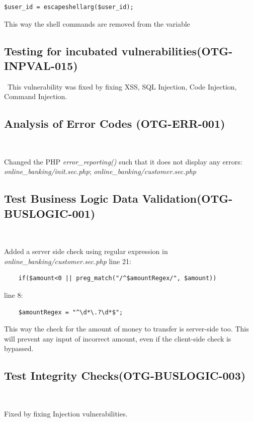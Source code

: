 \documentclass[headsepline,footsepline,footinclude=false,oneside,fontsize=11pt,paper=a4,listof=totoc,bibliography=totoc]{scrbook} %
\begin{document}
\begin{lstlisting} 
$user_id = escapeshellarg($user_id);
\end{lstlisting}

 This way the shell commands are removed from the variable\\
 

\subsection{Testing for incubated vulnerabilities(OTG-INPVAL-015)}\
This vulnerability was fixed by fixing XSS, SQL Injection, Code Injection, Command Injection.
 
 
\subsection{Analysis of Error Codes (OTG-ERR-001)}\

Changed the PHP \textit{error\_reporting()} such that it does not display any errors: \textit{online\_banking/init.sec.php}; \textit{online\_banking/customer.sec.php}\\

\pagebreak
\subsection{Test Business Logic Data Validation(OTG-BUSLOGIC-001)}\

Added a server side check using regular expression in \textit{online\_banking/customer.sec.php} line 21: 
	\begin{lstlisting} 
	if($amount<0 || preg_match("/^$amountRegex/", $amount)) 
	\end{lstlisting}
	
	line 8:  
	
	\begin{lstlisting} 
	$amountRegex = "^\d*\.?\d*$";
	\end{lstlisting}
	
This way the check for the amount of money to transfer is server-side too. This will prevent any input of incorrect amount, even if the client-side check is bypassed.\\

 
\subsection{Test Integrity Checks(OTG-BUSLOGIC-003)}\

Fixed by fixing Injection vulnerabilities.\\
 
\end{document}
